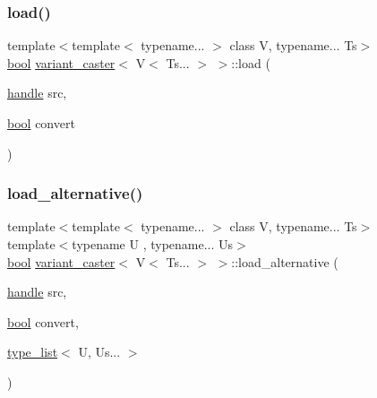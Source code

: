 \mbox{\label{structvariant__caster_3_01_v_3_01_ts_8_8_8_01_4_01_4_a196dec699b44e16b730169c58701af6a}} 
\subsubsection{\texorpdfstring{load()}{load()}}
{\footnotesize\ttfamily template$<$template$<$ typename... $>$ class V, typename... Ts$>$ \\
\mbox{\hyperlink{asdl_8h_af6a258d8f3ee5206d682d799316314b1}{bool}} \mbox{\hyperlink{structvariant__caster}{variant\+\_\+caster}}$<$ V$<$ Ts... $>$ $>$\+::load (\begin{DoxyParamCaption}\item[{\mbox{\hyperlink{classhandle}{handle}}}]{src,  }\item[{\mbox{\hyperlink{asdl_8h_af6a258d8f3ee5206d682d799316314b1}{bool}}}]{convert }\end{DoxyParamCaption})\hspace{0.3cm}{\ttfamily [inline]}}

\mbox{\label{structvariant__caster_3_01_v_3_01_ts_8_8_8_01_4_01_4_ab0b8352e25d9313f6fddcb19d1ce1bb2}} 
\subsubsection{\texorpdfstring{load\_alternative()}{load\_alternative()}\hspace{0.1cm}{\footnotesize\ttfamily [1/2]}}
{\footnotesize\ttfamily template$<$template$<$ typename... $>$ class V, typename... Ts$>$ \\
template$<$typename U , typename... Us$>$ \\
\mbox{\hyperlink{asdl_8h_af6a258d8f3ee5206d682d799316314b1}{bool}} \mbox{\hyperlink{structvariant__caster}{variant\+\_\+caster}}$<$ V$<$ Ts... $>$ $>$\+::load\+\_\+alternative (\begin{DoxyParamCaption}\item[{\mbox{\hyperlink{classhandle}{handle}}}]{src,  }\item[{\mbox{\hyperlink{asdl_8h_af6a258d8f3ee5206d682d799316314b1}{bool}}}]{convert,  }\item[{\mbox{\hyperlink{structtype__list}{type\+\_\+list}}$<$ U, Us... $>$}]{ }\end{DoxyParamCaption})\hspace{0.3cm}{\ttfamily [inline]}}


